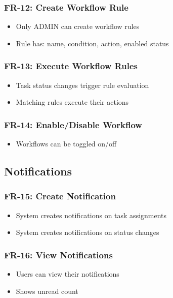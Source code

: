 \documentclass[12pt,a4paper,twoside]{book}
\begin{document}
\subsubsection{FR-12: Create Workflow Rule}
\begin{itemize}
    \item Only ADMIN can create workflow rules
    \item Rule has: name, condition, action, enabled status
\end{itemize}

\subsubsection{FR-13: Execute Workflow Rules}
\begin{itemize}
    \item Task status changes trigger rule evaluation
    \item Matching rules execute their actions
\end{itemize}

\subsubsection{FR-14: Enable/Disable Workflow}
\begin{itemize}
    \item Workflows can be toggled on/off
\end{itemize}

\subsection{Notifications}

\subsubsection{FR-15: Create Notification}
\begin{itemize}
    \item System creates notifications on task assignments
    \item System creates notifications on status changes
\end{itemize}

\subsubsection{FR-16: View Notifications}
\begin{itemize}
    \item Users can view their notifications
    \item Shows unread count
\end{itemize}
\end{document}
